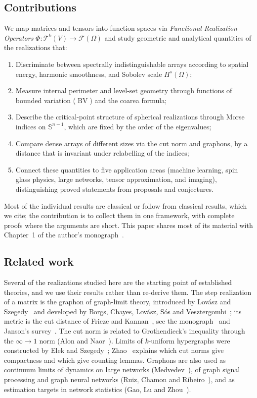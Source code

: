 \documentclass[11pt,a4paper,reqno]{amsart}
\theoremstyle{definition}
\numberwithin{equation}{section}
\newcommand{\Sph}{\mathbb{S}}
\newcommand{\BV}{\operatorname{BV}}
\begin{document}
\subsection*{Contributions}
We map matrices and tensors into function spaces via \emph{Functional Realization Operators} $\Phi \colon \mathcal{T}^k(V) \to \mathcal{F}(\Omega)$ and study geometric and analytical quantities of the realizations that:
\begin{enumerate}[label=\arabic*.]
    \item Discriminate between spectrally indistinguishable arrays according to spatial energy, harmonic smoothness, and Sobolev scale $H^s(\Omega)$;
    \item Measure internal perimeter and level-set geometry through functions of bounded variation ($\BV$) and the coarea formula;
    \item Describe the critical-point structure of spherical realizations through Morse indices on $\Sph^{n-1}$, which are fixed by the order of the eigenvalues;
    \item Compare dense arrays of different sizes via the cut norm and graphons, by a distance that is invariant under relabelling of the indices;
    \item Connect these quantities to five application areas (machine learning, spin glass physics, large networks, tensor approximation, and imaging), distinguishing proved statements from proposals and conjectures.
\end{enumerate}
Most of the individual results are classical or follow from classical results, which we cite; the contribution is to collect them in one framework, with complete proofs where the arguments are short. This paper shares most of its material with Chapter~1 of the author's monograph~\cite{silvafilho2026book}.

\subsection*{Related work}
Several of the realizations studied here are the starting point of established theories, and we use their results rather than re-derive them. The step realization of a matrix is the graphon of graph-limit theory, introduced by Lov\'asz and Szegedy~\cite{lovasz2006limits} and developed by Borgs, Chayes, Lov\'asz, S\'os and Vesztergombi~\cite{borgs2008convergent}; its metric is the cut distance of Frieze and Kannan~\cite{frieze1999quick}, see the monograph~\cite{lovasz2012large} and Janson's survey~\cite{janson2013graphons}. The cut norm is related to Grothendieck's inequality through the $\infty \to 1$ norm (Alon and Naor~\cite{alon2006approximating}). Limits of $k$-uniform hypergraphs were constructed by Elek and Szegedy~\cite{elek2012measure}; Zhao~\cite{zhao2015hypergraph} explains which cut norms give compactness and which give counting lemmas. Graphons are also used as continuum limits of dynamics on large networks (Medvedev~\cite{medvedev2014nonlinear}), of graph signal processing and graph neural networks (Ruiz, Chamon and Ribeiro~\cite{ruiz2021graphon,ruiz2020graphon}), and as estimation targets in network statistics (Gao, Lu and Zhou~\cite{gao2015rate}).
\end{document}
